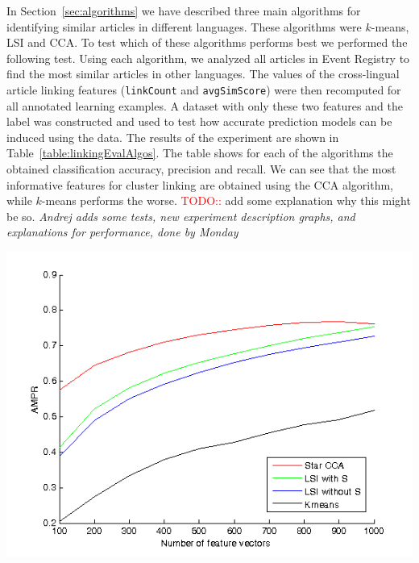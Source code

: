 \documentclass[twoside,11pt]{article}
\newcommand{\oldText}[1]{\textcolor{red}{#1:}\color{blue}}
\begin{document}
In Section~\ref{sec:algorithms} we have described three main algorithms for identifying similar articles in different languages. These algorithms were $k$-means, LSI and CCA. To test which of these algorithms performs best we performed the following test. Using each algorithm, we analyzed all articles in Event Registry to find the most similar articles in other languages. The values of the cross-lingual article linking features (\texttt{linkCount} and \texttt{avgSimScore}) were then recomputed for all annotated learning examples. A dataset with only these two features and the label was constructed and used to test how accurate prediction models can be induced using the data. The results of the experiment are shown in Table~\ref{table:linkingEvalAlgos}. The table shows for each of the algorithms the obtained classification accuracy, precision and recall. We can see that the most informative features for cluster linking are obtained using the CCA algorithm, while $k$-means performs the worse. {\oldText{TODO:} add some explanation why this might be so.}
\emph{Andrej adds some tests, new experiment description graphs, and explanations for performance, done by Monday}

\includegraphics{slika.png}
\end{document}
